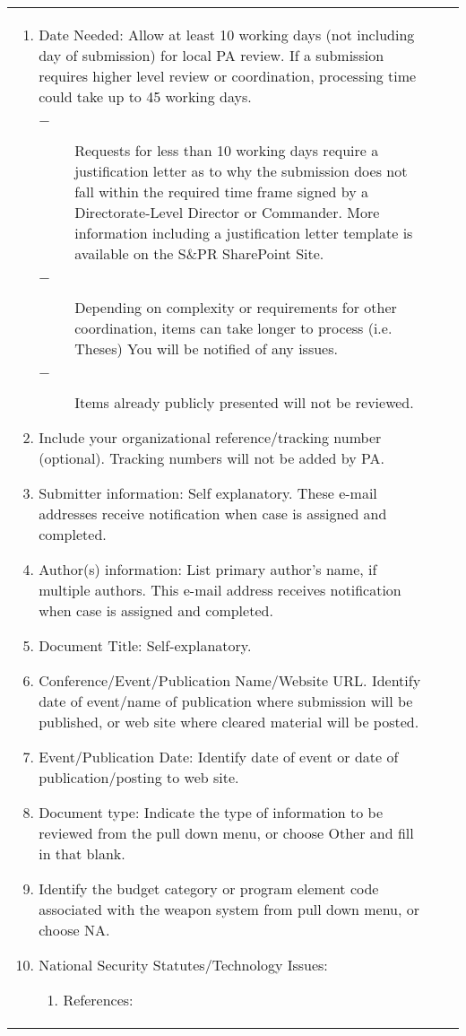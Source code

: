 \documentclass{article}
\begin{document}
{\begin{tabular}{|l|l|l|}
{{\begin{enumerate}
\item Date Needed:  Allow at least 10 working days (not including day of submission) for local PA review.  If a submission requires higher level review or coordination, processing time could take up to 45 working days.
\begin{description}
  \item[$-$] Requests for less than 10 working days require a justification letter as to why the submission does not fall within the required time frame signed by a Directorate-Level Director or Commander.  More information including a justification letter template is available on the S\&PR SharePoint Site.
  \item[$-$] Depending on complexity or requirements for other coordination, items can take longer to process (i.e. Theses)  You will be notified of any issues.
  \item[$-$] Items already publicly presented will not be reviewed.
\end{description}
\item Include your organizational reference/tracking number (optional). Tracking numbers will not be added by PA.
\item Submitter information:  Self explanatory. These e-mail addresses receive notification when case is assigned and completed.
\item Author(s) information: List primary author’s name, if multiple authors.
This e-mail address receives notification when case is assigned and completed.
\item Document Title: Self-explanatory.
\item Conference/Event/Publication Name/Website URL. Identify date of event/name of publication where submission will be published, or web site where
cleared material will be posted.
\item Event/Publication Date:  Identify date of event or date of publication/posting to web site.
\item Document type:  Indicate the type of information to be reviewed from the pull down menu, or choose Other and fill in that blank.
\item Identify the budget category or program element code associated with the weapon system from pull down menu, or choose NA.
\item National Security Statutes/Technology Issues:
\begin{enumerate}
  \item References:

\end{enumerate}
\end{enumerate}}}
\end{tabular}}
\end{document}
